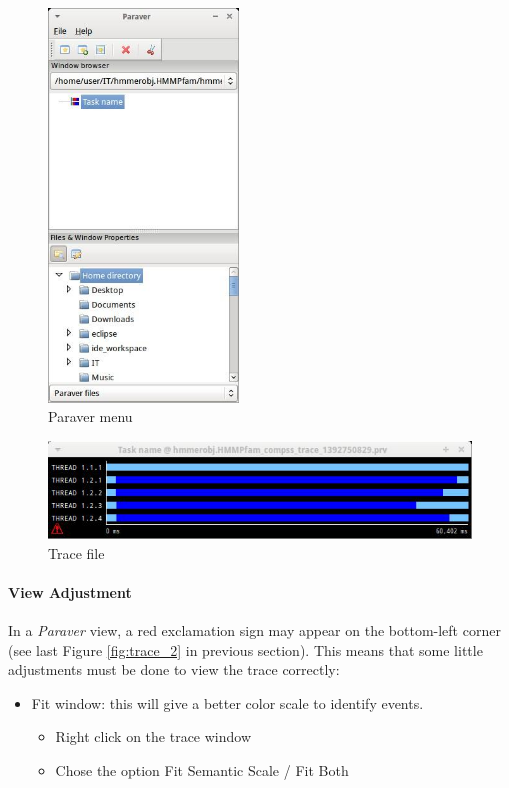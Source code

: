 \begin{figure}[ht!]
  \centering
    \includegraphics[width=0.45\textwidth]{./Sections/4_Tools/Figures/1.jpeg}
    \caption{Paraver menu}
\end{figure}
\label{fig:trace_1}

\begin{figure}[ht!]
  \centering
    \includegraphics[width=1.0\textwidth]{./Sections/4_Tools/Figures/2.jpeg}
    \caption{Trace file}
\end{figure}
\label{fig:trace_2}

\paragraph{View Adjustment}
In a \textit{Paraver} view, a red exclamation sign may appear on the bottom-left corner (see last Figure \ref{fig:trace_2} in 
previous section). This means that some little adjustments must be done to view the trace correctly:

\begin{itemize}
 \item Fit window: this will give a better color scale to identify events.
	\begin{itemize}
	    \item Right click on the trace window
	    \item Chose the option Fit Semantic Scale / Fit Both
	\end{itemize}
\end{itemize}

